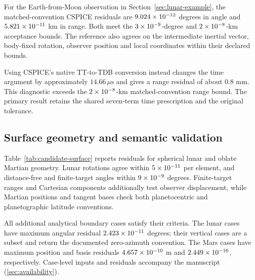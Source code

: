 For the Earth-from-Moon observation in Section~\ref{sec:lunar-example}, the matched-convention
CSPICE residuals are $9.024\times10^{-12}$ degrees in angle and $5.821\times10^{-11}$ km in range.
Both meet the $3\times10^{-9}$-degree and $2\times10^{-8}$-km acceptance bounds. The reference
also agrees on the intermediate inertial vector, body-fixed rotation, observer position and local
coordinates within their declared bounds.

Using CSPICE's native TT-to-TDB conversion instead changes the time argument by approximately
$14.66\,\mu\mathrm{s}$ and gives a range residual of about $0.8$ mm. This diagnostic exceeds the
$2\times10^{-8}$-km matched-convention range bound. The primary result retains the shared
seven-term time prescription and the original tolerance.

\subsection{Surface geometry and semantic validation}

Table~\ref{tab:candidate-surface} reports residuals for spherical lunar and oblate Martian
geometry. Lunar rotations agree within $5\times10^{-11}$ per element, and distance-free and
finite-target angles within $9\times10^{-9}$ degrees. Finite-target ranges and Cartesian
components additionally test observer displacement, while Martian positions and tangent bases check
both planetocentric and planetographic latitude conventions.

\begin{table}[!tbp]
    \centering
    \caption{Maximum surface-geometry residuals and declared acceptance bounds.
        Lunar references use analytical CSPICE \texttt{IAU\_MOON}; Mars references
        use independent ellipsoid geometry. Angular residuals combine altitude and
        wrapped azimuth per geometry; matrix, Cartesian and basis residuals use maximum
        absolute element or component differences. Unit $1$ is dimensionless.
        Counts refer to epochs or geometries, without multiplying by component count.}
    \label{tab:candidate-surface}
    \small
    \setlength{\tabcolsep}{3pt}
    
\end{table}

All \BoundaryTotalCount{} additional analytical boundary cases satisfy their criteria. The
\BoundaryLunarCount{} lunar cases have maximum angular residual $2.423\times10^{-11}$ degrees;
their \BoundaryVerticalCount{} vertical cases are a subset and return the documented zero-azimuth
convention. The \BoundaryMarsCount{} Mars cases have maximum position and basis residuals
$4.657\times10^{-10}$ m and $2.449\times10^{-16}$, respectively. Case-level inputs and
residuals accompany the manuscript (\ref{sec:availability}).

